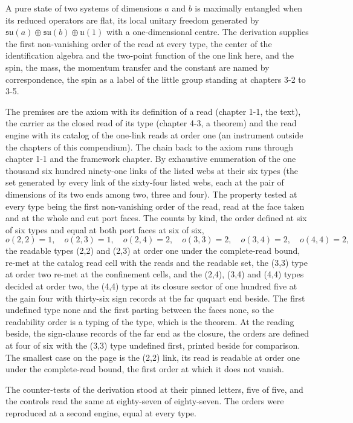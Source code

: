 \begin{chbridge}
A pure state of two systems of dimensions $a$ and $b$ is maximally entangled when its reduced operators are flat, its local unitary freedom generated by $\mathfrak{su}(a) \oplus \mathfrak{su}(b) \oplus \mathfrak{u}(1)$ with a one-dimensional centre. The derivation supplies the first non-vanishing order of the read at every type, the center of the identification algebra and the two-point function of the one link here, and the spin, the mass, the momentum transfer and the constant are named by correspondence, the spin as a label of the little group standing at chapters 3-2 to 3-5.
\end{chbridge}
\begin{chproof}[census]
The premises are the axiom with its definition of a read (chapter 1-1, the text), the carrier as the closed read of its type (chapter 4-3, a theorem) and the read engine with its catalog of the one-link reads at order one (an instrument outside the chapters of this compendium). The chain back to the axiom runs through chapter 1-1 and the framework chapter. By exhaustive enumeration of the one thousand six hundred ninety-one links of the listed webs at their six types (the set generated by every link of the sixty-four listed webs, each at the pair of dimensions of its two ends among two, three and four). The property tested at every type being the first non-vanishing order of the read, read at the face taken and at the whole and cut port faces. The counts by kind, the order defined at six of six types and equal at both port faces at six of six,
\begin{equation}
o(2,2)=1,\quad o(2,3)=1,\quad o(2,4)=2,\quad o(3,3)=2,\quad o(3,4)=2,\quad o(4,4)=2 ,
\end{equation}
the readable types (2,2) and (2,3) at order one under the complete-read bound, re-met at the catalog read cell with the reads and the readable set, the (3,3) type at order two re-met at the confinement cells, and the (2,4), (3,4) and (4,4) types decided at order two, the (4,4) type at its closure sector of one hundred five at the gain four with thirty-six sign records at the far ququart end beside. The first undefined type none and the first parting between the faces none, so the readability order is a typing of the type, which is the theorem. At the reading beside, the sign-clause records of the far end as the closure, the orders are defined at four of six with the (3,3) type undefined first, printed beside for comparison. The smallest case on the page is the (2,2) link, its read is readable at order one under the complete-read bound, the first order at which it does not vanish.

The counter-tests of the derivation stood at their pinned letters, five of five, and the controls read the same at eighty-seven of eighty-seven. The orders were reproduced at a second engine, equal at every type.
\end{chproof}
